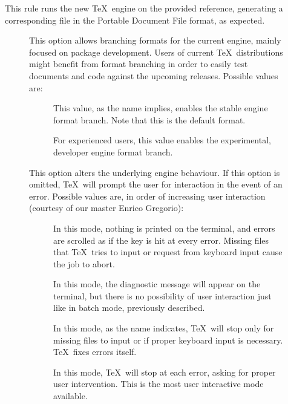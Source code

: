 \begin{description}
\item[]
This rule runs the new  \TeX\ engine on the provided  reference, generating a corresponding file in the Portable Document File format, as expected.

\begin{description}
\item[] This option allows branching formats for the current engine, mainly focused on package development. Users of current \TeX\ distributions might benefit from format branching in order to easily test documents and code against the upcoming releases. Possible values are:

\begin{description}
\item[] This value, as the name implies, enables the stable engine format branch. Note that this is the default format.

\item[] For experienced users, this value enables the experimental, developer engine format branch.
\end{description}

\item[] This option alters the underlying engine behaviour. If this option is omitted, \TeX\ will prompt the user for interaction in the event of an error. Possible values are, in order of increasing user interaction (courtesy of our master Enrico Gregorio):

\begin{description}
\item[] In this mode, nothing is printed on the terminal, and errors are scrolled as if the  key is hit at every error. Missing files that \TeX\ tries to input or request from keyboard input cause the job to abort.

\item[] In this mode, the diagnostic message will appear on the terminal, but there is no possibility of user interaction just like in batch mode, previously described.

\item[] In this mode, as the name indicates, \TeX\ will stop only for missing files to input or if proper keyboard input is necessary. \TeX\ fixes errors itself.

\item[] In this mode, \TeX\ will stop at each error, asking for proper user intervention. This is the most user interactive mode available.
\end{description}


\end{description}
\end{description}
